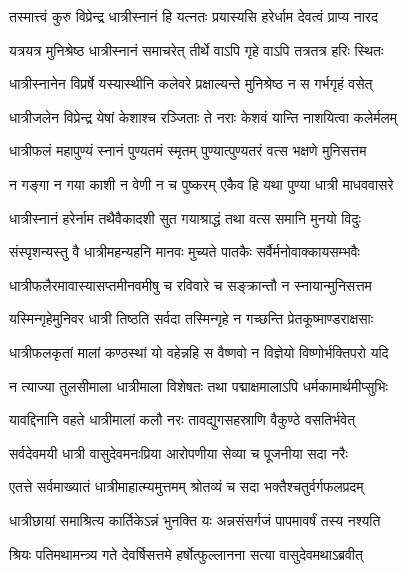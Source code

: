 \twolineshloka
{तस्मात्त्वं कुरु विप्रेन्द्र धात्रीस्नानं हि यत्नतः}
{प्रयास्यसि हरेर्धाम देवत्वं प्राप्य नारद} %

\twolineshloka
{यत्रयत्र मुनिश्रेष्ठ धात्रीस्नानं समाचरेत्}
{तीर्थे वाऽपि गृहे वाऽपि तत्रतत्र हरिः स्थितः} %

\twolineshloka
{धात्रीस्नानेन विप्रर्षे यस्यास्थीनि कलेवरे}
{प्रक्षाल्यन्ते मुनिश्रेष्ठ न स गर्भगृहं वसेत्} %

\twolineshloka
{धात्रीजलेन विप्रेन्द्र येषां केशाश्च रञ्जिताः}
{ते नराः केशवं यान्ति नाशयित्वा कलेर्मलम्} %

\twolineshloka
{धात्रीफलं महापुण्यं स्नानं पुण्यतमं स्मृतम्}
{पुण्यात्पुण्यतरं वत्स भक्षणे मुनिसत्तम} %

\twolineshloka
{न गङ्गा न गया काशी न वेणी न च पुष्करम्}
{एकैव हि यथा पुण्या धात्री माधववासरे} %

\twolineshloka
{धात्रीस्नानं हरेर्नाम तथैवैकादशी सुत}
{गयाश्राद्धं तथा वत्स समानि मुनयो विदुः} %

\twolineshloka
{संस्पृशन्यस्तु वै धात्रीमहन्यहनि मानवः}
{मुच्यते पातकैः सर्वैर्मनोवाक्कायसम्भवैः} %

\twolineshloka
{धात्रीफलैरमावास्यासप्तमीनवमीषु च}
{रविवारे च सङ्क्रान्तौ न स्नायान्मुनिसत्तम} %

\twolineshloka
{यस्मिन्गृहेमुनिवर धात्री तिष्ठति सर्वदा}
{तस्मिन्गृहे न गच्छन्ति प्रेतकूष्माण्डराक्षसाः} %

\twolineshloka
{धात्रीफलकृतां मालां कण्ठस्थां यो वहेन्नहि}
{स वैष्णवो न विज्ञेयो विष्णोर्भक्तिपरो यदि} %

\twolineshloka
{न त्याज्या तुलसीमाला धात्रीमाला विशेषतः}
{तथा पद्माक्षमालाऽपि धर्मकामार्थमीप्सुभिः} %

\twolineshloka
{यावद्दिनानि वहते धात्रीमालां कलौ नरः}
{तावद्युगसहस्राणि वैकुण्ठे वसतिर्भवेत्} %

\twolineshloka
{सर्वदेवमयी धात्री वासुदेवमनःप्रिया}
{आरोपणीया सेव्या च पूजनीया सदा नरैः} %

\twolineshloka
{एतत्ते सर्वमाख्यातं धात्रीमाहात्म्यमुत्तमम्}
{श्रोतव्यं च सदा भक्तैश्चतुर्वर्गफलप्रदम्} %

\twolineshloka
{धात्रीछायां समाश्रित्य कार्तिकेऽन्नं भुनक्ति यः}
{अन्नसंसर्गजं पापमावर्षं तस्य नश्यति} %





\twolineshloka
{श्रियः पतिमथामन्त्र्य गते देवर्षिसत्तमे}
{हर्षोत्फुल्लानना सत्या वासुदेवमथाऽब्रवीत्} %


